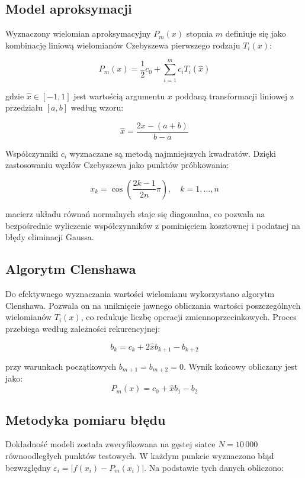 \documentclass[twoside]{article}
\begin{document}
\subsection{Model aproksymacji}
Wyznaczony wielomian aproksymacyjny $P_m(x)$ stopnia $m$ definiuje się jako kombinację liniową wielomianów Czebyszewa pierwszego rodzaju $T_i(x)$:

\begin{equation}
P_m(x) = \frac{1}{2}c_0 + \sum_{i=1}^{m} c_i T_i(\hat{x})
\end{equation}

gdzie $\hat{x} \in [-1, 1]$ jest wartością argumentu $x$ poddaną transformacji liniowej z przedziału $[a, b]$ według wzoru:

\begin{equation}
\hat{x} = \frac{2x - (a+b)}{b-a}
\end{equation}

Współczynniki $c_i$ wyznaczane są metodą najmniejszych kwadratów. Dzięki zastosowaniu węzłów Czebyszewa jako punktów próbkowania:

\begin{equation}
x_k = \cos\left( \frac{2k-1}{2n} \pi \right), \quad k=1, \dots, n
\end{equation}

macierz układu równań normalnych staje się diagonalna, co pozwala na bezpośrednie wyliczenie współczynników z pominięciem kosztownej i podatnej na błędy eliminacji Gaussa.

\subsection{Algorytm Clenshawa}
Do efektywnego wyznaczania wartości wielomianu wykorzystano algorytm Clenshawa. Pozwala on na uniknięcie jawnego obliczania wartości poszczególnych wielomianów $T_i(x)$, co redukuje liczbę operacji zmiennoprzecinkowych. Proces przebiega według zależności rekurencyjnej:

\begin{equation}
b_k = c_k + 2\hat{x}b_{k+1} - b_{k+2}
\end{equation}

przy warunkach początkowych $b_{m+1} = b_{m+2} = 0$. Wynik końcowy obliczany jest jako:
\begin{equation}
P_m(x) = c_0 + \hat{x}b_1 - b_2
\end{equation}

\subsection{Metodyka pomiaru błędu}
Dokładność modeli została zweryfikowana na gęstej siatce $N = 10\,000$ równoodległych punktów testowych. W każdym punkcie wyznaczono błąd bezwzględny $\varepsilon_i = |f(x_i) - P_m(x_i)|$. Na podstawie tych danych obliczono:
\end{document}
